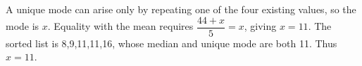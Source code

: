 A unique mode can arise only by repeating one of the four existing values, so the mode is $x$. Equality with the mean requires $\dfrac{44+x}{5}=x$, giving $x=11$. The sorted list is 8,9,11,11,16, whose median and unique mode are both 11. Thus $\boxed{x=11}$.
